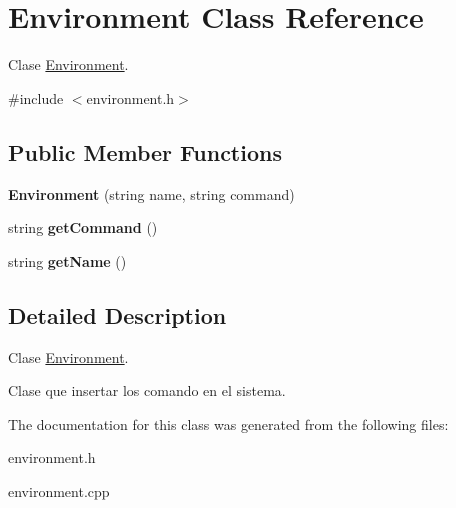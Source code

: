 \hypertarget{classEnvironment}{}\section{Environment Class Reference}
\label{classEnvironment}


Clase \hyperlink{classEnvironment}{Environment}.  




{\ttfamily \#include $<$environment.\+h$>$}

\subsection*{Public Member Functions}
\begin{DoxyCompactItemize}
\item 
{\bfseries Environment} (string name, string command)\hypertarget{classEnvironment_a804692799a19a2e0612bd073730c36d4}{}\label{classEnvironment_a804692799a19a2e0612bd073730c36d4}

\item 
string {\bfseries get\+Command} ()\hypertarget{classEnvironment_a6da44b720b34ec190de86e8912a74985}{}\label{classEnvironment_a6da44b720b34ec190de86e8912a74985}

\item 
string {\bfseries get\+Name} ()\hypertarget{classEnvironment_a4e1ced30d94f74ab2835363f97b7d713}{}\label{classEnvironment_a4e1ced30d94f74ab2835363f97b7d713}

\end{DoxyCompactItemize}


\subsection{Detailed Description}
Clase \hyperlink{classEnvironment}{Environment}. 

Clase que insertar los comando en el sistema. 

The documentation for this class was generated from the following files\+:\begin{DoxyCompactItemize}
\item 
environment.\+h\item 
environment.\+cpp\end{DoxyCompactItemize}
